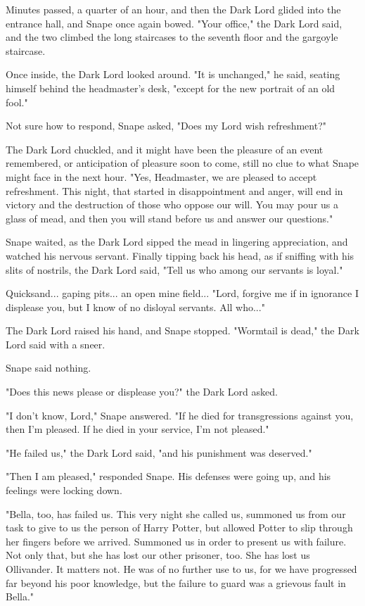 \documentclass[a4paper,11pt]{article}
\begin{document}
Minutes passed, a quarter of an hour, and then the Dark Lord glided into the entrance hall, and Snape once again bowed. "Your office," the Dark Lord said, and the two climbed the long staircases to the seventh floor and the gargoyle staircase.

Once inside, the Dark Lord looked around. "It is unchanged," he said, seating himself behind the headmaster's desk, "except for the new portrait of an old fool."

Not sure how to respond, Snape asked, "Does my Lord wish refreshment?"

The Dark Lord chuckled, and it might have been the pleasure of an event remembered, or anticipation of pleasure soon to come, still no clue to what Snape might face in the next hour. "Yes, Headmaster, we are pleased to accept refreshment. This night, that started in disappointment and anger, will end in victory and the destruction of those who oppose our will. You may pour us a glass of mead, and then you will stand before us and answer our questions."

Snape waited, as the Dark Lord sipped the mead in lingering appreciation, and watched his nervous servant. Finally tipping back his head, as if sniffing with his slits of nostrils, the Dark Lord said, "Tell us who among our servants is loyal."

Quicksand... gaping pits... an open mine field... "Lord, forgive me if in ignorance I displease you, but I know of no disloyal servants. All who..."

The Dark Lord raised his hand, and Snape stopped. "Wormtail is dead," the Dark Lord said with a sneer.

Snape said nothing.

"Does this news please or displease you?" the Dark Lord asked.

"I don't know, Lord," Snape answered. "If he died for transgressions against you, then I'm pleased. If he died in your service, I'm not pleased."

"He failed us," the Dark Lord said, "and his punishment was deserved."

"Then I am pleased," responded Snape. His defenses were going up, and his feelings were locking down.

"Bella, too, has failed us. This very night she called us, summoned us from our task to give to us the person of Harry Potter, but allowed Potter to slip through her fingers before we arrived. Summoned us in order to present us with failure. Not only that, but she has lost our other prisoner, too. She has lost us Ollivander. It matters not. He was of no further use to us, for we have progressed far beyond his poor knowledge, but the failure to guard was a grievous fault in Bella."
\end{document}
